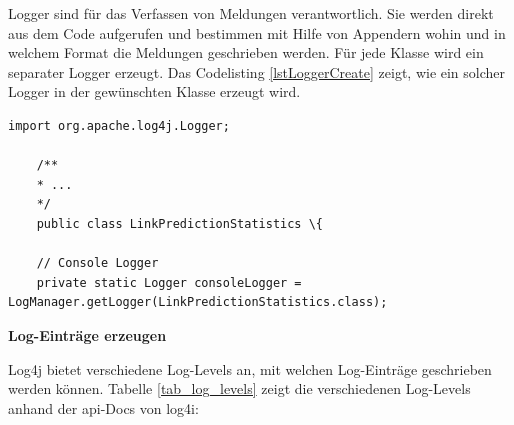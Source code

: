 Logger sind für das Verfassen von Meldungen verantwortlich. Sie werden direkt aus dem Code aufgerufen und bestimmen mit Hilfe von Appendern wohin und in welchem Format die Meldungen geschrieben werden.
Für jede Klasse wird ein separater Logger erzeugt. Das Codelisting \ref{lstLoggerCreate} zeigt, wie ein solcher Logger in der gewünschten Klasse erzeugt wird.

\begin{lstlisting}[caption={Erzeugen eines Loggers},label=lstLoggerCreate]
    import org.apache.log4j.Logger;

    /**
    * ...
    */
    public class LinkPredictionStatistics \{

    // Console Logger
    private static Logger consoleLogger = LogManager.getLogger(LinkPredictionStatistics.class);
\end{lstlisting}

\textbf{Log-Einträge erzeugen}

Log4j bietet verschiedene Log-Levels an, mit welchen Log-Einträge geschrieben werden können.
Tabelle \ref{tab_log_levels} zeigt die verschiedenen Log-Levels anhand der \acs{api}-Docs von log4i:

